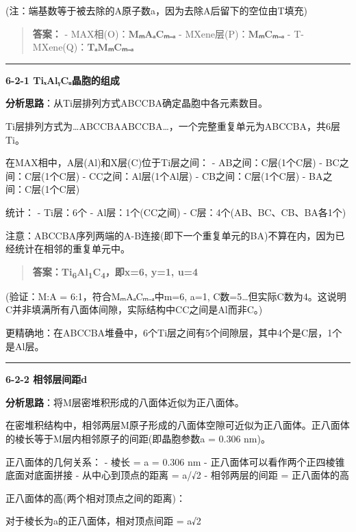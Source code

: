 (注：端基数等于被去除的A原子数a，因为去除A后留下的空位由T填充)

\begin{quote}
\textbf{答案：}
- MAX相(O)：\textbf{MₘAₐCₘ₋ₐ}
- MXene层(P)：\textbf{MₘCₘ₋ₐ}
- T-MXene(Q)：\textbf{TₐMₘCₘ₋ₐ}
\end{quote}

\begin{center}\rule{0.5\linewidth}{0.5pt}\end{center}

\textbf{6-2-1 TiₓAlᵧCᵤ晶胞的组成}

\textbf{分析思路}：从Ti层排列方式ABCCBA确定晶胞中各元素数目。

Ti层排列方式为\ldots ABCCBAABCCBA\ldots，一个完整重复单元为ABCCBA，共6层Ti。

在MAX相中，A层(Al)和X层(C)位于Ti层之间：
- AB之间：C层(1个C层)
- BC之间：C层(1个C层)
- CC之间：Al层(1个Al层)
- CB之间：C层(1个C层)
- BA之间：C层(1个C层)

统计：
- Ti层：6个
- Al层：1个(CC之间)
- C层：4个(AB、BC、CB、BA各1个)

注意：ABCCBA序列两端的A-B连接(即下一个重复单元的BA)不算在内，因为已经统计在相邻的重复单元中。

\begin{quote}
\textbf{答案：Ti\textsubscript{6}Al\textsubscript{1}C\textsubscript{4}，即x=6, y=1, u=4}
\end{quote}

(验证：M:A = 6:1，符合MₘAₐCₘ₋ₐ中m=6, a=1, C数=5\ldots 但实际C数为4。这说明C并非填满所有八面体间隙，实际结构中CC之间是Al而非C。)

更精确地：在ABCCBA堆叠中，6个Ti层之间有5个间隙层，其中4个是C层，1个是Al层。

\begin{center}\rule{0.5\linewidth}{0.5pt}\end{center}

\textbf{6-2-2 相邻层间距d}

\textbf{分析思路}：将M层密堆积形成的八面体近似为正八面体。

在密堆积结构中，相邻两层M原子形成的八面体空隙可近似为正八面体。正八面体的棱长等于M层内相邻原子的间距(即晶胞参数a = 0.306 nm)。

正八面体的几何关系：
- 棱长 = a = 0.306 nm
- 正八面体可以看作两个正四棱锥底面对底面拼接
- 从中心到顶点的距离 = a/√2
- 相邻两层的间距 = 正八面体的高

正八面体的高(两个相对顶点之间的距离)：

对于棱长为a的正八面体，相对顶点间距 = a√2

